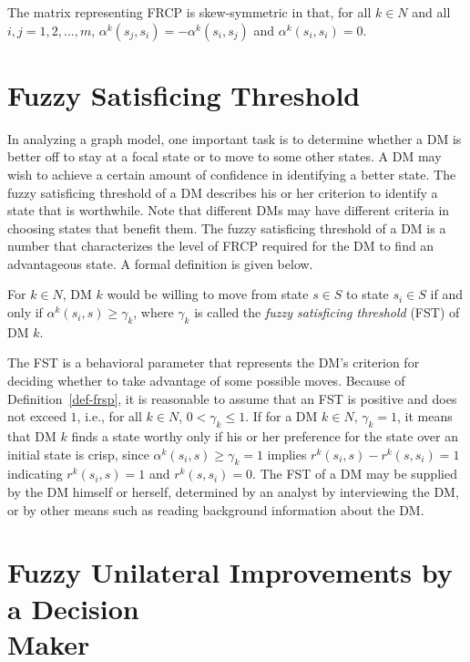 \begin{remark}
\rm The matrix representing FRCP is skew-symmetric in that, for all $k\in N$ and all $i, j=1, 2, ..., m$, $\alpha^k(s_j, s_i) = -\alpha^k(s_i, s_j)$ and $\alpha^k(s_i, s_i) = 0$.
\end{remark}

\section{Fuzzy Satisficing Threshold}\label{sec-fst}

In analyzing a graph model, one important task is to determine whether a DM is better off to stay at a focal state or to move to some other states. A DM may wish to achieve a certain amount of confidence in identifying a better state. The fuzzy satisficing threshold of a DM describes his or her criterion to identify a state that is worthwhile. Note that different DMs may have different criteria in choosing states that benefit them. The fuzzy satisficing threshold of a DM is a number that characterizes the level of FRCP required for the DM to find an advantageous state. A formal definition is given below.

\begin{definition}\label{fst}
\rm For $k \in N$, DM $k$ would be willing to move from state $s \in S$ to state $s_i \in S$ if and only if $\alpha^k(s_i, s) \geq \gamma_k$, where $\gamma_k$ is called the \emph{fuzzy satisficing threshold} (FST) of DM $k$.
\end{definition}

\noindent The FST is a behavioral parameter that represents the DM's criterion for deciding whether to take advantage of some possible moves. Because of Definition~\ref{def-frsp}, it is reasonable to assume that an FST is positive and does not exceed $1$, i.e., for all $k \in N$, $0 < \gamma_k \leq 1$. If for a DM $k \in N$, $\gamma_k=1$, it means that DM $k$ finds a state worthy only if his or her preference for the state over an initial state is crisp, since $\alpha^k(s_i, s) \geq \gamma_k=1$ implies $r^k(s_i, s)-r^k(s, s_i)=1$ indicating $r^k(s_i, s)=1$ and $r^k(s, s_i)=0$. The FST of a DM may be supplied by the DM himself or herself, determined by an analyst by interviewing the DM, or by other means such as reading background information about the DM.

\section{Fuzzy Unilateral Improvements by a Decision
\\Maker}\label{sec-fui-dm}

